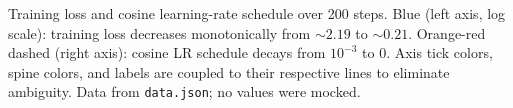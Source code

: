 \caption{Training loss and cosine learning-rate schedule over 200 steps.
Blue (left axis, log scale): training loss decreases monotonically from ${\sim}2.19$ to ${\sim}0.21$.
Orange-red dashed (right axis): cosine LR schedule decays from $10^{-3}$ to $0$.
Axis tick colors, spine colors, and labels are coupled to their respective lines to eliminate ambiguity.
Data from \texttt{data.json}; no values were mocked.}
